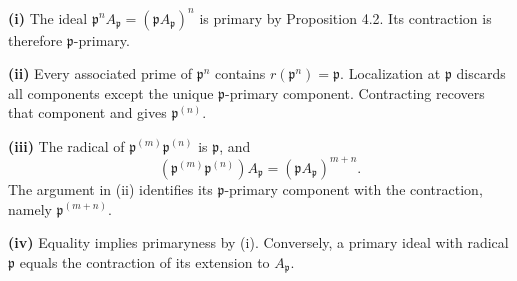 \textbf{(i)} The ideal $\mathfrak{p}^nA_{\mathfrak{p}}=(\mathfrak{p}A_{\mathfrak{p}})^n$ is primary by Proposition 4.2. Its contraction is therefore $\mathfrak{p}$-primary.

\textbf{(ii)} Every associated prime of $\mathfrak{p}^n$ contains $r(\mathfrak{p}^n)=\mathfrak{p}$. Localization at $\mathfrak{p}$ discards all components except the unique $\mathfrak{p}$-primary component. Contracting recovers that component and gives $\mathfrak{p}^{(n)}$.

\textbf{(iii)} The radical of $\mathfrak{p}^{(m)}\mathfrak{p}^{(n)}$ is $\mathfrak{p}$, and
\[(\mathfrak{p}^{(m)}\mathfrak{p}^{(n)})A_{\mathfrak{p}}=(\mathfrak{p}A_{\mathfrak{p}})^{m+n}.\]
The argument in (ii) identifies its $\mathfrak{p}$-primary component with the contraction, namely $\mathfrak{p}^{(m+n)}$.

\textbf{(iv)} Equality implies primaryness by (i). Conversely, a primary ideal with radical $\mathfrak{p}$ equals the contraction of its extension to $A_{\mathfrak{p}}$.
